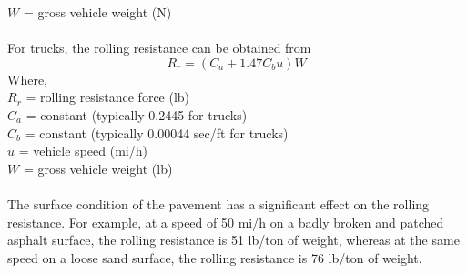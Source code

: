 \hspace*{10mm}$W$ = gross vehicle weight (N)\\\\
For trucks, the rolling resistance can be obtained from
\begin{equation}
	R_r = (C_a+1.47C_b u)W
\end{equation}
Where,\\
\hspace*{10mm}$R_r$ = rolling resistance force (lb)\\
\hspace*{10mm}$C_a$ = constant (typically 0.2445 for trucks)\\
\hspace*{10mm}$C_b$ = constant (typically 0.00044 sec/ft for trucks)\\
\hspace*{10mm}$u$ = vehicle speed (mi/h)\\
\hspace*{10mm}$W$ = gross vehicle weight (lb)\\\\
The surface condition of the pavement has a significant effect on the rolling resistance. For example, at a speed of 50 mi/h on a badly broken and patched asphalt surface, the rolling resistance is 51 lb/ton of weight, whereas at the same speed on a loose sand surface, the rolling resistance is 76 lb/ton of weight.
